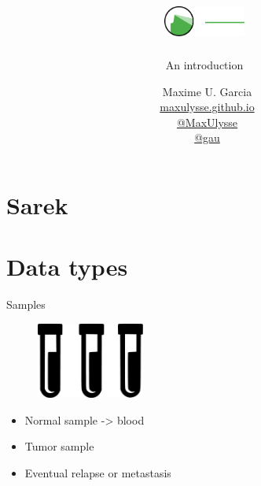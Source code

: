 \documentclass[usepdftitle=false]{beamer}
\title{%
	\vspace{-1.2cm}%
	\includegraphics[height=1cm]{pictures/Sarek_no_border_white}%
}
\subtitle{%
	\normalsize{An introduction}%
	\vspace{-.4cm}%
}
\author{
	\vspace{-.6cm}
	\faUser\ Maxime U. Garcia\\
	\faGlobe\ \href{https://maxulysse.github.io/}{maxulysse.github.io}\\
	\faGithub\ \href{https://github.com/MaxUlysse/}{@MaxUlysse}\\
	\faTwitter\ \href{https://twitter.com/gau/}{@gau}\\
}
\date{\vfill}
\begin{document}
\section{Sarek}

{
	\maketitle
}

\section{Data types}

\begin{frame}{Samples}
	\begin{figure}
		\includegraphics[height=2.5cm]{pictures/Samples}
	\end{figure}
	\begin{itemize}
		\item Normal sample -> blood
		\pause
		\item Tumor sample
		\pause
		\item Eventual relapse or metastasis
	\end{itemize}
\end{frame}
\end{document}
